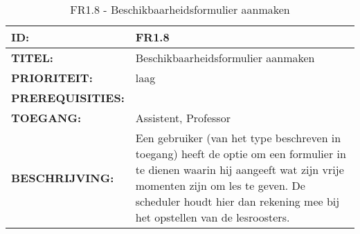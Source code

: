 
\noindent\begin{table}[H]
            \begin{tabular}{l | p{10cm}}
                \textbf{ID:} & FR1.8 \\ \hline
                \textbf{TITEL:} & Beschikbaarheidsformulier aanmaken\\ \hline
                \textbf{PRIORITEIT:} &  laag \\ \hline
                \textbf{PREREQUISITIES:} & \\ \hline
                \textbf{TOEGANG:} & Assistent, Professor \\ \hline
                \textbf{BESCHRIJVING:} & Een gebruiker (van het type beschreven in toegang) heeft de optie om een formulier in te dienen waarin hij aangeeft wat zijn vrije momenten zijn om les te geven. De scheduler houdt hier dan rekening mee bij het opstellen van de lesroosters.\\ 
            \end{tabular}\\
            \caption{FR1.8 - Beschikbaarheidsformulier aanmaken}
            \label{tab:FR1.8 - Beschikbaarheidsformulier aanmaken}
        \end{table}

\clearpage
